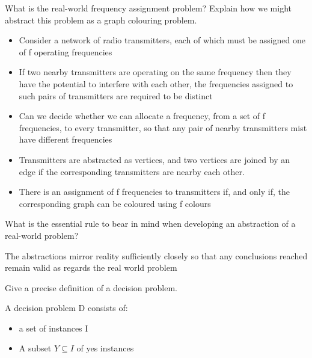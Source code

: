 \documentclass{exam}
\begin{document}
\begin{questions}
\question[4]What is the real-world frequency assignment problem? Explain how we might abstract this problem as a graph colouring problem.
\begin{solution}[2in]
	\begin{itemize}
		\item Consider a network of radio transmitters, each of which must be assigned one of f operating frequencies
		\item If two nearby transmitters are operating on the same frequency then they have the potential to interfere with each other, the frequencies assigned to such pairs of transmitters are required to be distinct
		\item Can we decide whether we can allocate a frequency, from a set of f frequencies, to every transmitter, so that any pair of nearby transmitters mist have different frequencies
		\item Transmitters are abstracted as vertices, and two vertices are joined by an edge if the corresponding transmitters are nearby each other.
		\item There is an assignment of f frequencies to transmitters if, and only if, the corresponding graph can be coloured using f colours
	\end{itemize}
\end{solution}


\question[2]What is the essential rule to bear in mind when developing an abstraction	of a real-world problem?
\begin{solution}[2in]
	The abstractions mirror reality sufficiently closely so that any conclusions reached remain valid as regards the real world problem
\end{solution}
\newpage
\question[2]Give a precise definition of a decision problem.
\begin{solution}[2in]
	A decision problem D consists of:
	\begin{itemize}
		\item a set of instances I
		\item A subset $Y\subseteq I$ of yes instances
	\end{itemize}
\end{solution}


\end{questions}
\end{document}
